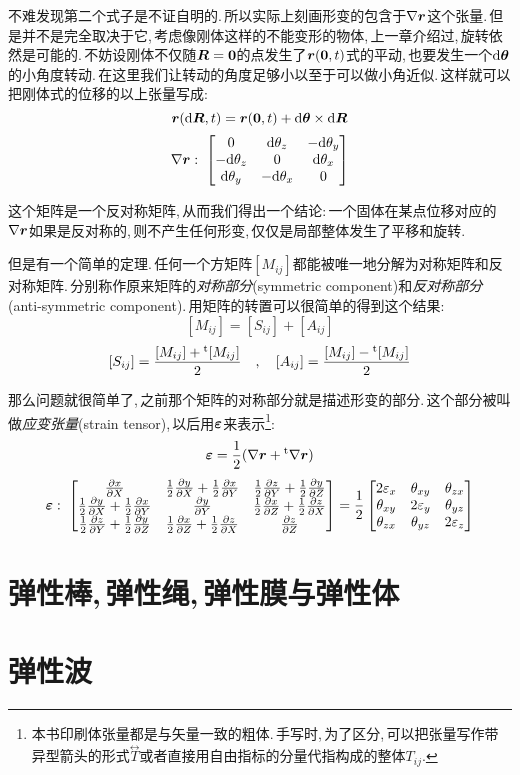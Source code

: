 不难发现第二个式子是不证自明的.\,所以实际上刻画形变的包含于$\nabla\boldsymbol{r}$这个张量.\,但是并不是完全取决于它,\,考虑像刚体这样的不能变形的物体,\,上一章介绍过,\,旋转依然是可能的.\,不妨设刚体不仅随$\boldsymbol{R}=\boldsymbol{0}$的点发生了$\boldsymbol{r}(\boldsymbol{0},t)$式的平动,\,也要发生一个$\textrm{d}\boldsymbol{\theta}$的小角度转动.\,在这里我们让转动的角度足够小以至于可以做小角近似.\,这样就可以把刚体式的位移的以上张量写成:
\[\boldsymbol{r}(\textrm{d} \boldsymbol{R},t)=\boldsymbol{r}(\boldsymbol{0},t)+\textrm{d} \boldsymbol{\theta}\times \textrm{d} \boldsymbol{R}\]
\[\nabla\boldsymbol{r}:\; \begin{bmatrix} 0&\textrm{d} \theta_z &-\textrm{d} \theta_y \\-\textrm{d} \theta_z&0&\textrm{d} \theta_x \\ \textrm{d} \theta_y &-\textrm{d} \theta_x &0\end{bmatrix}\]

这个矩阵是一个反对称矩阵,\,从而我们得出一个结论:\,一个固体在某点位移对应的$\nabla\boldsymbol{r}$如果是反对称的,\,则不产生任何形变,\,仅仅是局部整体发生了平移和旋转.

但是有一个简单的定理.\,任何一个方矩阵$[M_{ij}]$都能被唯一地分解为对称矩阵和反对称矩阵.\,分别称作原来矩阵的\emph{对称部分}(symmetric component)和\emph{反对称部分}(anti-symmetric component).\,用矩阵的转置可以很简单的得到这个结果:
\[[M_{ij}]=[S_{ij}]+[A_{ij}]\]
\[[S_{ij}]=\frac{[M_{ij}]+\phantom{}^{\rm t}[M_{ij}]}{2}\quad,\quad [A_{ij}]=\frac{[M_{ij}]-\phantom{}^{\rm t}[M_{ij}]}{2}\]

那么问题就很简单了,\,之前那个矩阵的对称部分就是描述形变的部分.\,这个部分被叫做\emph{应变张量}(strain tensor),\,以后用$\boldsymbol{\varepsilon}$来表示\footnote{本书印刷体张量都是与矢量一致的粗体.\,手写时,\,为了区分,\,可以把张量写作带异型箭头的形式$\stackrel{\leftrightarrow}{T}$或者直接用自由指标的分量代指构成的整体$T_{ij}$.}:
\[\boldsymbol{\varepsilon}=\frac{1}{2}(\nabla\boldsymbol{r}+\phantom{}^{\rm t}\nabla\boldsymbol{r})\]
\[\boldsymbol{\varepsilon}:\; \begin{bmatrix}\frac{\partial x}{\partial X}&\frac{1}{2}\frac{\partial y}{\partial X}+\frac{1}{2}\frac{\partial x}{\partial Y}&\frac{1}{2}\frac{\partial z}{\partial Y}+\frac{1}{2}\frac{\partial y}{\partial Z}\\\frac{1}{2}\frac{\partial y}{\partial X}+\frac{1}{2}\frac{\partial x}{\partial Y}&\frac{\partial y}{\partial Y}&\frac{1}{2}\frac{\partial x}{\partial Z}+\frac{1}{2}\frac{\partial z}{\partial X}\\\frac{1}{2}\frac{\partial z}{\partial Y}+\frac{1}{2}\frac{\partial y}{\partial Z}&\frac{1}{2}\frac{\partial x}{\partial Z}+\frac{1}{2}\frac{\partial z}{\partial X}&\frac{\partial z}{\partial Z}\end{bmatrix}=\frac{1}{2}\begin{bmatrix} 2\varepsilon_x&\theta_{xy} &\theta_{zx} \\ \theta_{xy}&2\varepsilon_y&\theta_{yz} \\ \theta_{zx}&\theta_{yz}&2\varepsilon_z\end{bmatrix}\]


\section{弹性棒,\,弹性绳,\,弹性膜与弹性体}

\section{弹性波}

